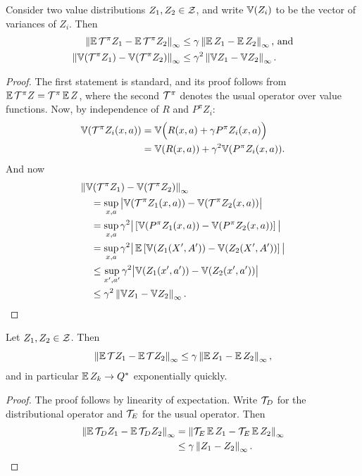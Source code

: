 \documentclass{article}
\def \cTpi {\cT^\pi}
\begin{document}
\begin{prop}[Sobel, 1982]
Consider two value distributions $Z_1, Z_2 \in \mathcal{Z}$, and write $\mathbb{V}(Z_i)$ to be the vector of variances of $Z_i$. Then
\begin{align*}
\infnorm{\expect \cTpi Z_1 - \expect \cTpi Z_2} &\le \gamma \infnorm{\expect Z_1 - \expect Z_2} \text{, and} \\
\infnorm{\Var(\cTpi Z_1) - \Var(\cTpi Z_2)} &\le \gamma^2 \infnorm{\Var Z_1 - \Var Z_2} .
\end{align*}
\begin{proof}
The first statement is standard, and its proof follows from $\expect \cTpi Z = \cTpi \expect Z$, where the second $\cTpi$ denotes the usual operator over value functions. Now, by independence of $R$ and $P^\pi Z_i$:
\begin{align*}
\Var(\cTpi Z_i(x,a)) &= \Var\Big(R(x,a) + \gamma P^\pi Z_i(x,a)\Big)  \\
&= \Var(R(x,a)) + \gamma^2 \Var(P^\pi Z_i(x,a)) .
\end{align*}
And now
\begin{align*}
\infnorm{\Var (\cTpi Z_1) - \Var(\cTpi Z_2)} & \\
&\hspace{-10em}= \sup_{x,a} \big | \Var(\cTpi Z_1(x,a)) - \Var(\cTpi Z_2(x,a)) \big | \\
&\hspace{-10em}= \sup_{x,a} \gamma^2 \big | \left [ \Var(P^\pi Z_1(x,a)) - \Var(P^\pi Z_2(x,a)) \right ] \big | \\
&\hspace{-10em}= \sup_{x,a} \gamma^2 \big | \expect \left [ \Var(Z_1(X', A')) - \Var(Z_2(X', A')) \right ] \big | \\
&\hspace{-10em}\le \sup_{x',a'} \gamma^2 \big | \Var(Z_1(x',a')) - \Var(Z_2(x', a')) \big | \\
&\hspace{-10em}\le \gamma^2 \infnorm{\Var Z_1 - \Var Z_2} . \qedhere
\end{align*}
\end{proof}
\end{prop}

\begin{lem}
Let $Z_1, Z_2 \in \mathcal{Z}$. Then
\begin{equation*}
\infnorm{\expect \cT Z_1 - \expect \cT Z_2} \le \gamma \infnorm{\expect Z_1 - \expect Z_2},
\end{equation*}
and in particular $\expect Z_k \to Q^*$ exponentially quickly.
\end{lem}
\begin{proof}
The proof follows by linearity of expectation. Write $\mathcal{T}_D$ for the distributional operator and $\mathcal{T}_E$ for the usual operator. Then
\begin{align*}
\infnorm{\expect \cT_D Z_1 - \expect \cT_D Z_2} &= \infnorm{\cT_E \expect Z_1 - \cT_E \expect Z_2} \\
&\le \gamma \infnorm{Z_1 - Z_2}. \qedhere
\end{align*}
\end{proof}
\end{document}
